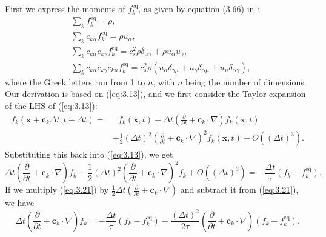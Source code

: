 \documentclass[a4paper, 11pt]{report}
\begin{document}
First we express the moments of $f_k^{\mathrm{eq}}$, as given by equation (3.66) in \cite{lbtextbook}:
\begin{subequations} \label{eq:3.19}
\begin{align}
    &\sum_k f_k^{\mathrm{eq}} = \rho, \label{eq:3.19a}\\
    &\sum_k c_{k\alpha} f_k^{\mathrm{eq}} = \rho u_\alpha, \label{eq:3.19b}\\
    &\sum_k c_{k\alpha} c_{k\gamma} f_k^{\mathrm{eq}} = c_s^2\rho\delta_{\alpha\gamma} +  \rho u_\alpha u_\gamma, \label{eq:3.19c}\\
    &\sum_k c_{k\alpha} c_{k\gamma} c_{k\mu} f_k^{\mathrm{eq}} = c_s^2\rho \left(u_\alpha\delta_{\gamma\mu} + u_\gamma\delta_{\alpha\mu} + u_\mu\delta_{\alpha\gamma}\right),\label{eq:3.19d}
\end{align}
\end{subequations}
where the Greek letters run from 1 to $n$, with $n$ being the number of dimensions. Our derivation is based on (\ref{eq:3.13}), and we first consider the Taylor expansion of the LHS of (\ref{eq:3.13}):
\begin{align}
    f_k(\mathbf{x} + \mathbf{c}_k\Delta t, t + \Delta t) =& \text{ } f_k(\mathbf{x},t) + \Delta t\left(\frac{\partial}{\partial t} + \mathbf{c}_k\cdot\nabla\right)f_k(\mathbf{x},t) \nonumber \\
    &+ \frac{1}{2}(\Delta t)^2\left(\frac{\partial}{\partial t} + \mathbf{c}_k\cdot\nabla\right)^2 f_k(\mathbf{x},t) + O((\Delta t)^3). \label{eq:3.20}
\end{align}
Substituting this back into (\ref{eq:3.13}), we get
\begin{equation}
    \Delta t \left(\frac{\partial}{\partial t} + \mathbf{c}_k\cdot\nabla\right)f_k + \frac{1}{2}(\Delta t)^2\left(\frac{\partial}{\partial t} + \mathbf{c}_k\cdot\nabla\right)^2 f_k + O((\Delta t)^3) = -\frac{\Delta t}{\tau}(f_k - f_k^{\mathrm{eq}}). \label{eq:3.21}
\end{equation}
If we multiply (\ref{eq:3.21}) by $\frac{1}{2}\Delta t \left(\frac{\partial}{\partial t} + \mathbf{c}_k\cdot\nabla\right)$ and subtract it from (\ref{eq:3.21}), we have
\begin{equation}
    \Delta t \left(\frac{\partial}{\partial t} + \mathbf{c}_k\cdot\nabla\right)f_k = -\frac{\Delta t}{\tau}(f_k-f_k^{\mathrm{eq}}) + \frac{(\Delta t)^2}{2\tau}\left(\frac{\partial}{\partial t} + \mathbf{c}_k\cdot\nabla\right)(f_k-f_k^{\mathrm{eq}}). \label{eq:3.22}
\end{equation}
\end{document}
